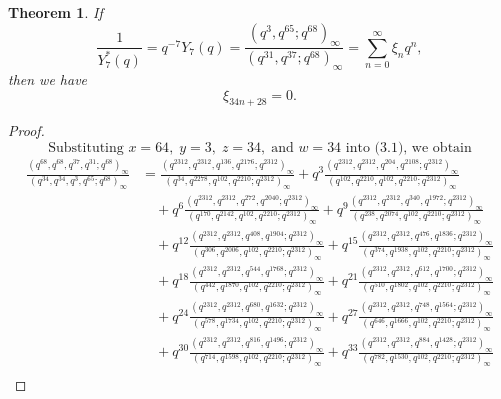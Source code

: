 \documentclass[11pt,a4paper]{article}
\numberwithin{equation}{section}
\theoremstyle{plain}
\newtheorem{theorem}{Theorem}[section]
\begin{document}
	\begin{theorem}
		If
		\[
		\frac{1}{Y_7^*(q)} = q^{-7} Y_7(q)
		= \frac{(q^{3}, q^{65}; q^{68})_\infty}{(q^{31}, q^{37}; q^{68})_\infty}
		= \sum_{n=0}^{\infty} \xi_n q^n,
		\]
		then we have
		\[
		\xi_{34n+28} = 0.
		\]
	\end{theorem}
	\begin{proof}
			\[
		\text{Substituting } x = 64,\; y = 3,\; z = 34,\; \text{and } w = 34 \text{ into (3.1), we obtain}
		\]
		\[
		\begin{aligned}
			\frac{(q^{68}, q^{68}, q^{37}, q^{31}; q^{68})_{\infty}} 
			{(q^{34}, q^{34}, q^{3}, q^{65}; q^{68})_{\infty}} 
			&= \frac{(q^{2312}, q^{2312}, q^{136}, q^{2176}; q^{2312})_{\infty}}
			{(q^{34}, q^{2278}, q^{102}, q^{2210}; q^{2312})_{\infty}}
			+ q^{3}\frac{(q^{2312}, q^{2312}, q^{204}, q^{2108}; q^{2312})_{\infty}}
			{(q^{102}, q^{2210}, q^{102}, q^{2210}; q^{2312})_{\infty}} \\
			&\quad + q^{6}\frac{(q^{2312}, q^{2312}, q^{272}, q^{2040}; q^{2312})_{\infty}}
			{(q^{170}, q^{2142}, q^{102}, q^{2210}; q^{2312})_{\infty}}
			+ q^{9}\frac{(q^{2312}, q^{2312}, q^{340}, q^{1972}; q^{2312})_{\infty}}
			{(q^{238}, q^{2074}, q^{102}, q^{2210}; q^{2312})_{\infty}} \\
			&\quad + q^{12}\frac{(q^{2312}, q^{2312}, q^{408}, q^{1904}; q^{2312})_{\infty}}
			{(q^{306}, q^{2006}, q^{102}, q^{2210}; q^{2312})_{\infty}}
			+ q^{15}\frac{(q^{2312}, q^{2312}, q^{476}, q^{1836}; q^{2312})_{\infty}}
			{(q^{374}, q^{1938}, q^{102}, q^{2210}; q^{2312})_{\infty}} \\
			&\quad + q^{18}\frac{(q^{2312}, q^{2312}, q^{544}, q^{1768}; q^{2312})_{\infty}}
			{(q^{442}, q^{1870}, q^{102}, q^{2210}; q^{2312})_{\infty}} 
			+ q^{21}\frac{(q^{2312}, q^{2312}, q^{612}, q^{1700}; q^{2312})_{\infty}}
			{(q^{510}, q^{1802}, q^{102}, q^{2210}; q^{2312})_{\infty}} \\
			&\quad + q^{24}\frac{(q^{2312}, q^{2312}, q^{680}, q^{1632}; q^{2312})_{\infty}}
			{(q^{578}, q^{1734}, q^{102}, q^{2210}; q^{2312})_{\infty}}
			+ q^{27}\frac{(q^{2312}, q^{2312}, q^{748}, q^{1564}; q^{2312})_{\infty}}
			{(q^{646}, q^{1666}, q^{102}, q^{2210}; q^{2312})_{\infty}} \\
			&\quad + q^{30}\frac{(q^{2312}, q^{2312}, q^{816}, q^{1496}; q^{2312})_{\infty}}
			{(q^{714}, q^{1598}, q^{102}, q^{2210}; q^{2312})_{\infty}}
			+ q^{33}\frac{(q^{2312}, q^{2312}, q^{884}, q^{1428}; q^{2312})_{\infty}}
			{(q^{782}, q^{1530}, q^{102}, q^{2210}; q^{2312})_{\infty}} \\

\end{aligned}\]
\end{proof}
\end{document}
